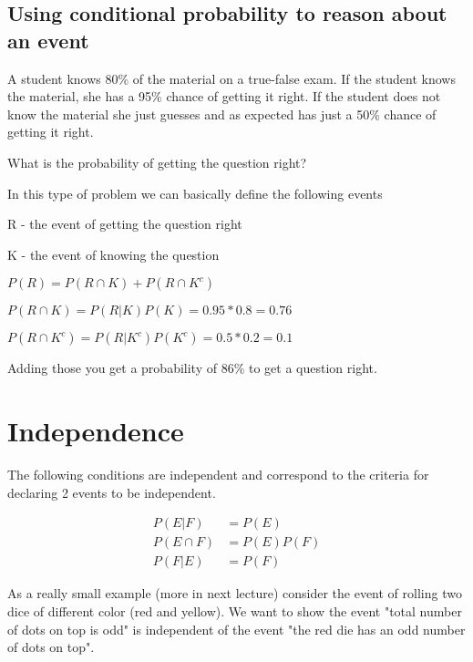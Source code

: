 \documentclass[12pt]{article}
\begin{document}
\subsection*{Using conditional probability to reason about an event}

A student knows 80\% of the material on a true-false exam. If the student knows the material, she has a 95\% chance of getting it right. If the student does not know the material she just guesses and as expected has just a 50\% chance of getting it right.

What is the probability of getting the question right?

In this type of problem we can basically define the following events

R - the event of getting the question right

K - the event of knowing the question

$P(R) = P(R \cap K) + P(R \cap K^c)$

$P(R \cap K) = P(R|K)P(K) = 0.95 * 0.8 = 0.76$

$P(R \cap K^c) = P(R|K^c)P(K^c) = 0.5 * 0.2 = 0.1$

Adding those you get a probability of 86\% to get a question right.

\section*{Independence}

The following conditions are independent and correspond to the criteria for declaring 2 events to be independent.

\begin{align*}
P(E|F) &= P(E) \\
P(E \cap F) &= P(E)P(F) \\
P(F|E) &= P(F)
\end{align*}

\medskip

As a really small example (more in next lecture) consider the event of rolling two dice of different color (red and yellow). We want to show the event "total number of dots on top is odd" is independent of the event "the red die has an odd number of dots on top".
\end{document}
